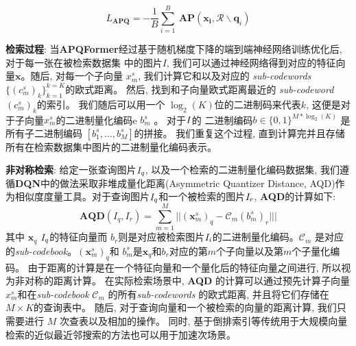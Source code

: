 \begin{equation}
    L_{\textbf{APQ}} = - \frac{1}{B}\sum_{i=1}^{B} \ \mathbf{AP}(\mathbf{x_i}, \mathcal{R} \backslash \mathbf{q}_i)
\end{equation}\par
\textbf{检索过程}: 当\textbf{APQFormer}经过基于随机梯度下降的端到端神经网络训练优化后, 对于每一张在被检索数据集
中的图片$I$, 我们可以通过神经网络得到对应的特征向量$\mathbf{x}$。随后, 对每一个子向量 $x_m^s$, 我们计算它和以及对应的 \textit{sub-codewords}$\{ (c_m^s)_k \}_{k=1}^{k=K}$的欧式距离。 然后, 找到和子向量欧式距离最近的 \textit{sub-codeword} $(c_m^s)_k$的索引。 我们随后可以用一个 $\log_2 (K)$位的二进制码来代表$k$, 这便是对于子向量$x_m^s$的二进制量化编码e $b_m^s$ 。
对于$\it{I}$的 二进制编码$b \in \{0,1\}^{M*\log_2(K)}$ 是所有子二进制编码 $[b_1^s,\ldots,b_M^s]$的拼接。 我们重复这个过程, 直到计算完并且存储所有在检索数据集中图片的二进制量化编码表示。\par
\textbf{非对称检索}:  
给定一张查询图片$\it{I}_q$, 以及一个检索的二进制量化编码数据集, 我们遵循\textbf{DQN}中的做法采取非堆成量化距离(Asymmetric Quantizer Distance, AQD)作为相似度度量工具。对于查询图片$\it{I}_q$和一个被检索的图片$\it{I}_r$, \textbf{AQD}的计算如下:
\begin{equation}
    \mathbf{AQD}(I_q,I_r) = \sum_{m=1}^{M} || (\mathbf{x}_m^s)_q - \mathcal{C}_m (b_m^s)_r |||
\end{equation}
其中 $\mathbf{x}_q$ $\it{I}_q$的特征向量而 $b_r$则是对应被检索图片$\it{I}_i$的二进制量化编码。$\mathcal{C}_m$ 是对应的\textit{sub-codebook}。$(\mathbf{x}_m^s)_q$和 $b_m^s$是$\mathbf{x}_q$和$b_r$对应的第$m$个子向量以及第$m$个子量化编码。
由于距离的计算是在一个特征向量和一个量化后的特征向量之间进行, 所以视为非对称的距离计算。 在实际检索场景中, \textbf{AQD} 的计算可以通过预先计算子向量$x_m^s$和在\textit{sub-codebook} $\mathcal{C}_m$ 的所有\textit{sub-codewords} 的欧式距离, 并且将它们存储在 $M \times K$的查询表中。 随后, 对于查询向量和一个被检索的向量的距离计算, 我们只需要进行 $M$ 次查表以及相加的操作。 同时, 基于倒排索引\cite{babenko2014inverted}等传统用于大规模向量检索的近似最近邻搜索的方法也可以用于加速次场景。

